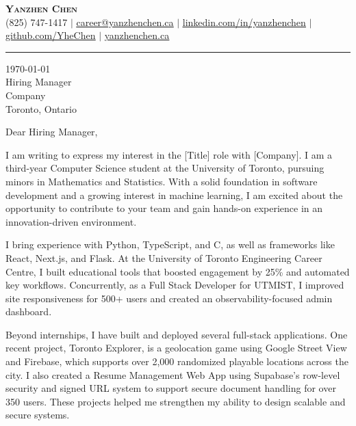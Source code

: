 \documentclass[letterpaper,11pt]{article}
\begin{document}
\begin{adjustwidth}{-0.0in}{-0.0in}
    {\fontsize{9pt}{12pt}\selectfont
    \begin{center}
        \textbf{\Huge \scshape Yanzhen Chen} \\ \vspace{1pt}
        (825) 747-1417 $|$ 
        \href{mailto:career@yanzhenchen.ca}{\underline{career@yanzhenchen.ca}} $|$ 
        \href{https://linkedin.com/in/yanzhenchen}{\underline{linkedin.com/in/yanzhenchen}} $|$
        \href{https://github.com/YheChen}{\underline{github.com/YheChen}} $|$ 
        \href{https://yanzhenchen.ca/}{\underline{yanzhenchen.ca}}
    \end{center}
    }
\end{adjustwidth}

\vspace{-6pt}
    \noindent\rule{6.5in}{0.6pt}
\today\\
\vspace{20pt}
Hiring Manager\\
Company\\
Toronto, Ontario

\vspace{20pt}
Dear Hiring Manager,\\
\vspace{20pt}

I am writing to express my interest in the [Title] role with [Company]. I am a third-year Computer Science student at the University of Toronto, pursuing minors in Mathematics and Statistics. With a solid foundation in software development and a growing interest in machine learning, I am excited about the opportunity to contribute to your team and gain hands-on experience in an innovation-driven environment.

\vspace{10pt}

I bring experience with Python, TypeScript, and C, as well as frameworks like React, Next.js, and Flask. At the University of Toronto Engineering Career Centre, I built educational tools that boosted engagement by 25\% and automated key workflows. Concurrently, as a Full Stack Developer for UTMIST, I improved site responsiveness for 500+ users and created an observability-focused admin dashboard.


\vspace{10pt}

Beyond internships, I have built and deployed several full-stack applications. One recent project, Toronto Explorer, is a geolocation game using Google Street View and Firebase, which supports over 2,000 randomized playable locations across the city. I also created a Resume Management Web App using Supabase’s row-level security and signed URL system to support secure document handling for over 350 users. These projects helped me strengthen my ability to design scalable and secure systems.
\end{document}
